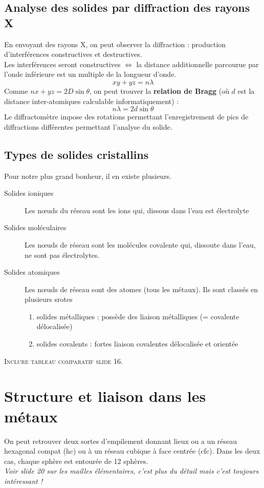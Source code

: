 \documentclass[british,french,11pt, a4paper, openany]{book}
\begin{document}
	\subsection*{Analyse des solides par diffraction des rayons X}
	En envoyant des rayons X, on peut observer la diffraction : production d'interférences constructives et destructives.\\
	Les interférences seront constructives $\Leftrightarrow$ la distance additionnelle parcourue par l'onde inférieure est un multiple de la longueur d'onde.
	$$xy + yz = n\lambda$$
	Comme $nx + yz = 2D\sin \theta$, on peut trouver la \textbf{relation de Bragg} (où $d$ est la distance inter-atomiques calculable informatiquement) :
	$$n\lambda = 2d\sin \theta$$
	Le diffractomètre impose des rotations permettant l'enregistrement de pics de diffractions différentes permettant l'analyse du solide.
	
	\subsection*{Types de solides cristallins}
	Pour notre plus grand bonheur, il en existe plusieurs.
	\begin{description}
		\item[Solides ioniques] Les nœuds du réseau sont les ions qui, dissous dans l'eau est électrolyte 
		\item[Solides moléculaires] Les nœuds de réseau sont les molécules covalente qui, dissoute dans l'eau, ne sont pas électrolytes.
		\item[Solides atomiques] Les nœuds de réseau sont des atomes (tous les métaux). Ils sont classés en plusieurs srotes
		\begin{enumerate}
			\item solides métalliques : possède des liaison métalliques (= covalente délocalisée)
			\item solides covalents : fortes liaison covalentes délocalisée et orientée
		\end{enumerate}
	\end{description}
	\textsc{Inclure tableau comparatif slide 16.}
	
	
	\section{Structure et liaison dans les métaux}
	On peut retrouver deux sortes d'empilement donnant lieux ou a un réseau hexagonal compat (hc) ou à un réseau cubique à face centrée (cfc). Dans les deux cas, chaque sphère est entourée de 12 sphères.\\
	\textit{Voir slide 20 sur les mailles élémentaires, c'est plus du détail mais c'est toujours intéressant !}
	
\end{document}
